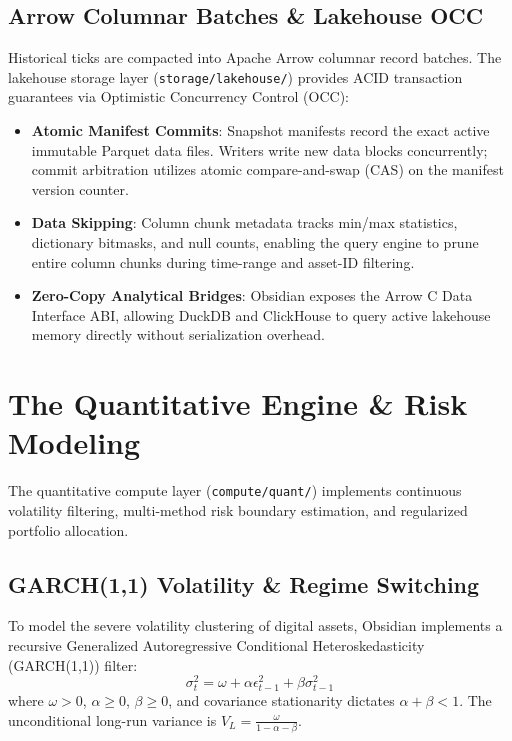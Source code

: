 \documentclass[10pt,journal,compsoc]{IEEEtran}
\begin{document}
\subsection{Arrow Columnar Batches \& Lakehouse OCC}
Historical ticks are compacted into Apache Arrow columnar record batches. The lakehouse storage layer (\texttt{storage/lakehouse/}) provides ACID transaction guarantees via Optimistic Concurrency Control (OCC):
\begin{itemize}
    \item \textbf{Atomic Manifest Commits}: Snapshot manifests record the exact active immutable Parquet data files. Writers write new data blocks concurrently; commit arbitration utilizes atomic compare-and-swap (CAS) on the manifest version counter.
    \item \textbf{Data Skipping}: Column chunk metadata tracks min/max statistics, dictionary bitmasks, and null counts, enabling the query engine to prune entire column chunks during time-range and asset-ID filtering.
    \item \textbf{Zero-Copy Analytical Bridges}: Obsidian exposes the Arrow C Data Interface ABI, allowing DuckDB and ClickHouse to query active lakehouse memory directly without serialization overhead.
\end{itemize}

\section{The Quantitative Engine \& Risk Modeling}

The quantitative compute layer (\texttt{compute/quant/}) implements continuous volatility filtering, multi-method risk boundary estimation, and regularized portfolio allocation.

\subsection{GARCH(1,1) Volatility \& Regime Switching}
To model the severe volatility clustering of digital assets, Obsidian implements a recursive Generalized Autoregressive Conditional Heteroskedasticity (GARCH(1,1)) filter:
\begin{equation}
\sigma_t^2 = \omega + \alpha \epsilon_{t-1}^2 + \beta \sigma_{t-1}^2
\end{equation}
where $\omega > 0$, $\alpha \ge 0$, $\beta \ge 0$, and covariance stationarity dictates $\alpha + \beta < 1$. The unconditional long-run variance is $V_L = \frac{\omega}{1 - \alpha - \beta}$.
\end{document}
